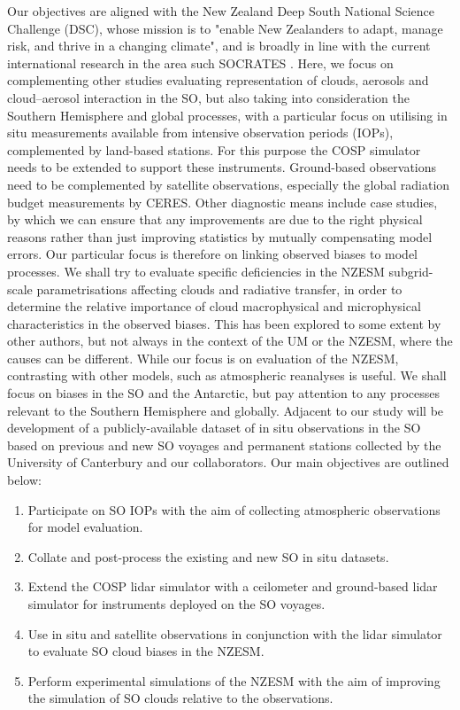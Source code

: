 Our objectives are aligned with the New Zealand Deep South National
Science Challenge (DSC), whose mission is to "enable New Zealanders to adapt,
manage risk, and thrive in a changing climate", and is
broadly in line with the current international research in the area
such SOCRATES \citep{mcfarquhar2014}.
Here, we focus on complementing other studies evaluating
representation of clouds, aerosols and cloud--aerosol interaction in the SO,
but also taking into consideration the Southern Hemisphere and global processes,
with a particular focus on utilising in situ measurements
available from intensive observation periods (IOPs), complemented by land-based
stations. For this
purpose the COSP simulator needs to be extended to support these
instruments. Ground-based observations need to be
complemented by satellite observations, especially the global radiation budget
measurements by CERES.
Other diagnostic means include
case studies, by which we can ensure that any improvements are due to
the right physical reasons rather than just improving statistics by mutually
compensating model errors. Our particular focus is therefore on linking
observed biases to model processes. 
We shall try to evaluate specific deficiencies in the NZESM subgrid-scale
parametrisations affecting clouds and radiative transfer, in order to
determine the relative importance of cloud macrophysical and microphysical
characteristics in the observed biases. This has been explored to some extent
by other authors, but not always in the context of the UM or the NZESM,
where the causes can be different.
While our focus is on evaluation of the NZESM, contrasting with other
models, such as atmospheric reanalyses is useful.
We shall focus on biases in the SO and the
Antarctic, but pay attention to any processes relevant to the Southern
Hemisphere and globally.
Adjacent to our study will be development of a publicly-available dataset
of in situ observations in the SO based on previous and new SO voyages
and permanent stations collected by the University of Canterbury and our
collaborators.
Our main objectives are outlined below:

\begin{enumerate}
\item Participate on SO IOPs
with the aim of collecting atmospheric observations for model evaluation.
\item Collate and post-process the existing and new SO in situ datasets.
\item Extend the COSP lidar simulator with a ceilometer and ground-based lidar
simulator for instruments deployed on the SO voyages.
\item Use in situ and satellite observations in conjunction with the lidar simulator
to evaluate SO cloud biases in the NZESM.
\item Perform experimental simulations of the NZESM with the aim of
improving the simulation of SO clouds relative to the observations.
\end{enumerate}

